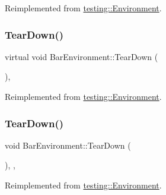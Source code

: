 Reimplemented from \mbox{\hyperlink{classtesting_1_1_environment_a1bf8cafaa9d4eba9feb98655ee434eb3}{testing\+::\+Environment}}.

\mbox{\label{class_bar_environment_a384f951da72a2a18bb0c2b3506376b09}} 
\subsubsection{\texorpdfstring{TearDown()}{TearDown()}\hspace{0.1cm}{\footnotesize\ttfamily [1/3]}}
{\footnotesize\ttfamily virtual void Bar\+Environment\+::\+Tear\+Down (\begin{DoxyParamCaption}{ }\end{DoxyParamCaption})\hspace{0.3cm}{\ttfamily [inline]}, {\ttfamily [virtual]}}



Reimplemented from \mbox{\hyperlink{classtesting_1_1_environment_a039bdaa705c46b9b88234cf4d3bb6254}{testing\+::\+Environment}}.

\mbox{\label{class_bar_environment_ac02b15d5b27e33232c578f0340442bbb}} 
\subsubsection{\texorpdfstring{TearDown()}{TearDown()}\hspace{0.1cm}{\footnotesize\ttfamily [2/3]}}
{\footnotesize\ttfamily void Bar\+Environment\+::\+Tear\+Down (\begin{DoxyParamCaption}{ }\end{DoxyParamCaption})\hspace{0.3cm}{\ttfamily [inline]}, {\ttfamily [override]}, {\ttfamily [virtual]}}



Reimplemented from \mbox{\hyperlink{classtesting_1_1_environment_a039bdaa705c46b9b88234cf4d3bb6254}{testing\+::\+Environment}}.

\mbox{\label{class_bar_environment_ac02b15d5b27e33232c578f0340442bbb}} 
